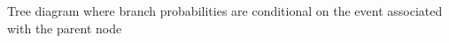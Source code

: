 \label{fig:condprob}
Tree diagram where branch probabilities are conditional on the event associated with the parent node